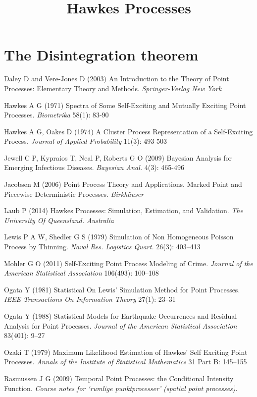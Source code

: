 \documentclass[11pt,a4paper]{article}
\title{Hawkes Processes}
\begin{document}
\section{The Disintegration theorem}



\begin{thebibliography}{99}

 Daley D and Vere-Jones D (2003) An Introduction to the Theory of Point Processes: Elementary Theory and Methods. \textit{Springer-Verlag New York}

 Hawkes A G (1971) Spectra of Some Self-Exciting and Mutually Exciting Point Processes. \textit{Biometrika} 58(1): 83-90

 Hawkes A G, Oakes D (1974) A Cluster Process Representation of a Self-Exciting Process. \textit{Journal of Applied Probability} 11(3): 493-503

 Jewell C P, Kypraios T, Neal P, Roberts G O (2009) Bayesian Analysis for Emerging Infectious Diseases. \textit{Bayesian Anal.} 4(3): 465-496

 Jacobsen M (2006) Point Process Theory and Applications. Marked Point and Piecewise Deterministic Processes. \textit{Birkh\"{a}user}

 Laub P (2014) Hawkes Processes: Simulation, Estimation, and Validation. \textit{The University Of Queensland. Australia}

 Lewis P A W, Shedler G S (1979) Simulation of Non Homogeneous Poisson Process by Thinning. \textit{Naval Res. Logistics Quart.} 26(3): 403–413

 Mohler G O (2011) Self-Exciting Point Process Modeling of Crime. \textit{Journal of the American Statistical Association} 106(493): 100–108

 Ogata Y (1981) Statistical On Lewis' Simulation Method for Point Processes. \textit{IEEE Transactions On Information Theory} 27(1): 23–31

 Ogata Y (1988) Statistical Models for Earthquake Occurrences and Residual Analysis for Point Processes. \textit{Journal of the American Statistical Association} 83(401): 9–27

 Ozaki T (1979) Maximum Likelihood Estimation of Hawkes' Self Exciting Point Processes. \textit{Annals of the Institute of Statistical Mathematics} 31 Part B: 145–155

 Rasmussen J G (2009) Temporal Point Processes: the Conditional Intensity Function. \textit{Course notes for ‘rumlige punktprocesser’ (spatial point processes)}.


\end{thebibliography}
\end{document}
